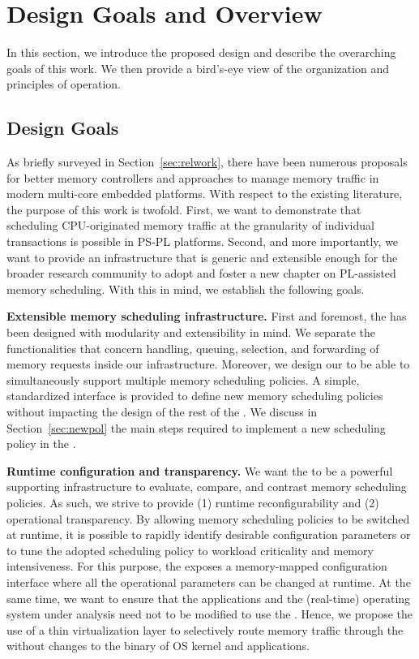 \section{Design Goals and Overview}\label{sec:overview}

In this section, we introduce the proposed \schim design and describe
the overarching goals of this work. We then provide a bird's-eye view
of the \schim organization and principles of operation.

\subsection{Design Goals}\label{sec:design_goals}
As briefly surveyed in Section~\ref{sec:relwork}, there have been
numerous proposals for better memory controllers and approaches to
manage memory traffic in modern multi-core embedded platforms. With
respect to the existing literature, the purpose of this work is
twofold. First, we want to demonstrate that scheduling CPU-originated
memory traffic at the granularity of individual transactions is
possible in PS-PL platforms. Second, and more importantly, we want to
provide an infrastructure that is generic and extensible enough for
the broader research community to adopt and foster a new chapter on
PL-assisted memory scheduling. With this in mind, we establish the
following goals.

\par{\bf Extensible memory scheduling infrastructure.} First and
foremost, the \schim has been designed with modularity and
extensibility in mind. We separate the functionalities that concern
handling, queuing, selection, and forwarding of memory requests inside
our infrastructure. Moreover, we design our \schim to be able to
simultaneously support multiple memory scheduling policies. A simple,
standardized interface is provided to define new memory scheduling
policies without impacting the design of the rest of the \schim. We
discuss in Section~\ref{sec:newpol} the main steps required to
implement a new scheduling policy in the \schim.

\par{\bf Runtime configuration and transparency.} We want the \schim
to be a powerful supporting infrastructure to evaluate, compare, and
contrast memory scheduling policies. As such, we strive to provide (1)
runtime reconfigurability and (2) operational transparency. By
allowing memory scheduling policies to be switched at runtime, it is
possible to rapidly identify desirable configuration parameters or to
tune the adopted scheduling policy to workload criticality and memory
intensiveness. For this purpose, the \schim exposes a memory-mapped
configuration interface where all the operational parameters can be
changed at runtime. At the same time, we want to ensure that the
applications and the (real-time) operating system under analysis need
not to be modified to use the \schim. Hence, we propose the use of a
thin virtualization layer to selectively route memory traffic through
the \schim without changes to the binary of OS kernel and
applications.

